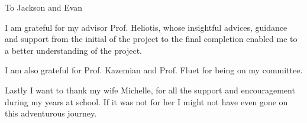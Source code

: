 \documentclass[12pt,american]{report}
\begin{document}
\vfill
\begin{center}
To Jackson and Evan
\end{center}
\vfill

%
\vfill
\begin{center}
\indent I am grateful for my advisor Prof. Heliotis, whose insightful advices, guidance and support from the initial of the project to the final completion enabled me to a better understanding of the project.

I am also grateful for Prof. Kazemian and Prof. Fluet for being on my committee.

Lastly I want to thank my wife Michelle, for all the support and encouragement during my years at school. If it was not for her I might not have even gone on this adventurous journey.
\end{center}
\vfill

\newcommand{\etc} {\emph{etc.\/}}
\newcommand{\etal}{\emph{et~al.\/}}
\newcommand{\eg}  {\emph{e.g.\/}}
\newcommand{\ie}  {\emph{i.e.\/}}






\afterpreface%
\end{document}
